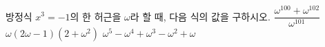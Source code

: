 방정식 $x^3=-1$의 한 허근을 $\omega$라 할 때, 다음 식의 값을 구하시오.
 $\dfrac{\omega^{100}+\omega^{102}}{\omega^{101}}$
 $\omega(2\omega-1)(2+\omega^2)$
 $\omega^5-\omega^4+\omega^3-\omega^2+\omega$
